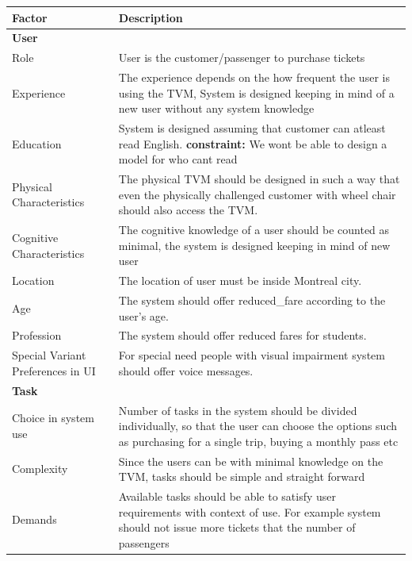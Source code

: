 \documentclass[a4paper,12pt]{report}
\begin{document}
\setlength{\tabcolsep}{18pt}
\renewcommand{\arraystretch}{1.5}
\begin{tabular}[H]{ |p{3cm}|p{12cm}| }
	\hline
	\textbf{Factor}  & \textbf{Description}  \\
	\hline
	\textbf{User} &   \\
	\hline
	Role &
	User is the customer/passenger to purchase tickets
	\\
	\hline
	Experience & 
	The experience depends on the how frequent the user is using the TVM, System is designed keeping in mind of a new user without any system knowledge
	\\
	\hline
	Education &
	System is designed assuming that customer can atleast read English. \textbf{constraint:} We wont be able to design a model for who cant read
	\\
	\hline
	Physical Characteristics    &
	The physical TVM should be designed in such a way that even the physically challenged customer with wheel chair should also access the TVM.
	\\
	\hline
	Cognitive Characteristics & 
	The cognitive knowledge of a user should be counted as minimal, the system is designed keeping in mind of new user
	\\
	\hline
	Location & 
	The location of user must be inside Montreal city.
	\\
	\hline
	Age & 
	The system should offer \gls{reduced_fare} according to the user's age.
	\\
	\hline
	Profession & 
	The system should offer reduced fares for students.
	\\
	\hline
	Special Variant Preferences in UI & 
	For special need people with visual impairment system should offer voice messages.
	\\
	\hline
	\textbf{Task} &  \\
	\hline
	Choice in system use &
	Number of tasks in the system should be divided individually, so that the user can choose the options such as purchasing for a single trip, buying a monthly pass etc
	\\
	\hline
	Complexity & 
	Since the users can be with minimal knowledge on the TVM, tasks should be simple and straight forward
	\\
	\hline
	Demands &
	Available tasks should be able to satisfy user requirements with context of use. For example system should not issue more tickets that the number of passengers 
	\\
	\hline 
\end{tabular}
\end{document}

